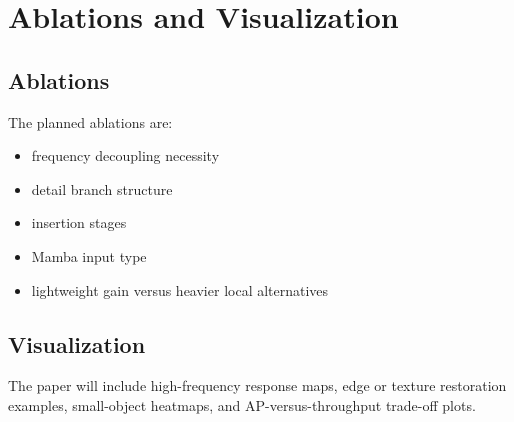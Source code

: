 \section{Ablations and Visualization}

\subsection{Ablations}

The planned ablations are:

\begin{itemize}[leftmargin=1.5em]
  \item frequency decoupling necessity
  \item detail branch structure
  \item insertion stages
  \item Mamba input type
  \item lightweight gain versus heavier local alternatives
\end{itemize}

\subsection{Visualization}

The paper will include high-frequency response maps, edge or texture restoration examples, small-object heatmaps, and AP-versus-throughput trade-off plots.

